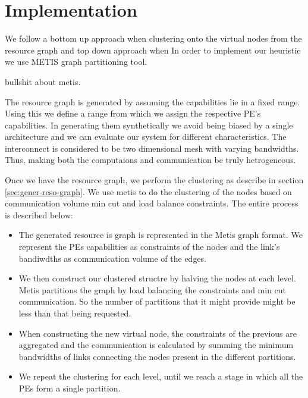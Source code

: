 \section{Implementation}
\label{sec:imple}

We follow a bottom up approach when clustering onto the virtual nodes
from the resource graph and top down approach when
In order to implement our heuristic we use METIS \cite{} graph
partitioning tool.

bullshit about metis.

The resource graph is generated by assuming the capabilities lie in a
fixed range. Using this we define a range from which we assign the
respective PE's capabilities. In generating them synthetically we avoid
being biased by a single architecture and we can evaluate our system
for different characteristics. The interconnect is considered to be two
dimensional mesh with varying bandwidths. Thus, making both the
computaions and communication be truly hetrogeneous.

Once we have the resource graph, we perform the clustering as describe
in section \ref{sec:gener-reso-graph}. We use metis to do the
clustering of the nodes based on communication volume min cut and load
balance constraints. The entire process is described below:

\begin{itemize}

\item The generated resource is graph is represented in the Metis
graph format. We represent the PEs capabilities as constraints of the
nodes and the link's bandiwdths as communication volume of the edges.

\item We then construct our clustered structre by halving the nodes at
each level. Metis partitions the graph by load balancing the
constraints and min cut communication. So the number of partitions
that it might provide might be less than that being requested.

\item When constructing the new virtual node, the constraints of the
previous are aggregated and the communication is calculated by summing
the minimum bandwidths of links connecting the nodes present in the
different partitions.

\item We repeat the clustering for each level, until we reach a stage
in which all the PEs form a single partition.

\end{itemize}

